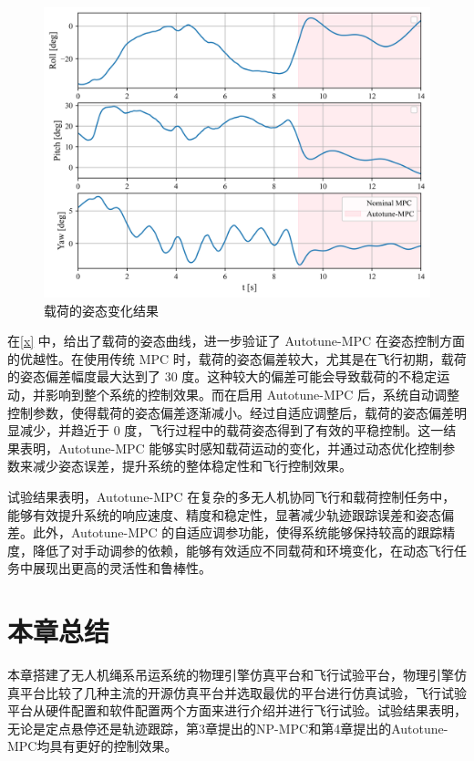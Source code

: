 \documentclass[lang=chs, degree=master, blindreview=false, winfonts=true]{yanputhesis}
\begin{document}
\begin{figure}[H]
	\centering
	\includegraphics[width=28pc]{picture/kk/7.png} 
	\caption{载荷的姿态变化结果} 
	\label{x}
\end{figure}
在\autoref{x} 中，给出了载荷的姿态曲线，进一步验证了 Autotune-MPC 在姿态控制方面的优越性。在使用传统 MPC 时，载荷的姿态偏差较大，尤其是在飞行初期，载荷的姿态偏差幅度最大达到了 30 度。这种较大的偏差可能会导致载荷的不稳定运动，并影响到整个系统的控制效果。而在启用 Autotune-MPC 后，系统自动调整控制参数，使得载荷的姿态偏差逐渐减小。经过自适应调整后，载荷的姿态偏差明显减少，并趋近于 0 度，飞行过程中的载荷姿态得到了有效的平稳控制。这一结果表明，Autotune-MPC 能够实时感知载荷运动的变化，并通过动态优化控制参数来减少姿态误差，提升系统的整体稳定性和飞行控制效果。

试验结果表明，Autotune-MPC 在复杂的多无人机协同飞行和载荷控制任务中，能够有效提升系统的响应速度、精度和稳定性，显著减少轨迹跟踪误差和姿态偏差。此外，Autotune-MPC 的自适应调参功能，使得系统能够保持较高的跟踪精度，降低了对手动调参的依赖，能够有效适应不同载荷和环境变化，在动态飞行任务中展现出更高的灵活性和鲁棒性。


\section{本章总结}
本章搭建了无人机绳系吊运系统的物理引擎仿真平台和飞行试验平台，物理引擎仿真平台比较了几种主流的开源仿真平台并选取最优的平台进行仿真试验，飞行试验平台从硬件配置和软件配置两个方面来进行介绍并进行飞行试验。试验结果表明，无论是定点悬停还是轨迹跟踪，第3章提出的NP-MPC和第4章提出的Autotune-MPC均具有更好的控制效果。
\end{document}
